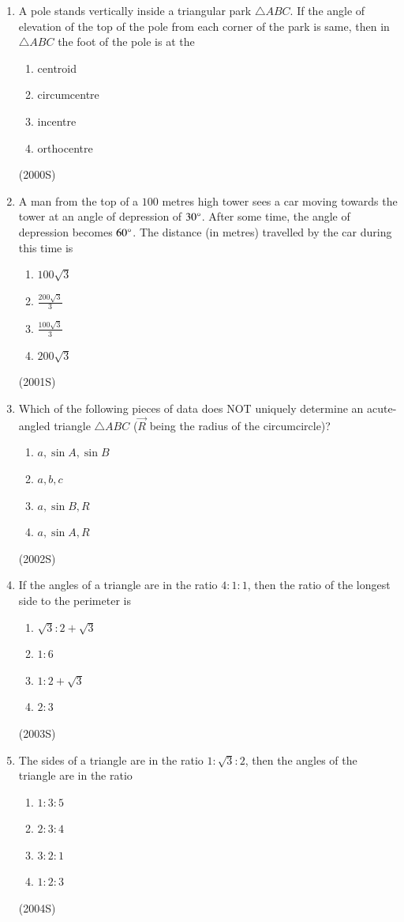 \documentclass[journal]{IEEEtran}
\begin{document}
\begin{enumerate}
\item A pole stands vertically inside a triangular park $\triangle ABC$. If the angle of elevation of the top of the pole from each corner of the park is same, then in $\triangle ABC$ the foot of the pole is at the
\begin{enumerate}
\item centroid
\item circumcentre
\item incentre
\item orthocentre
\end{enumerate}
\hfill (2000S)

\item A man from the top of a $100$ metres high tower sees a car moving towards the tower at an angle of depression of $30\degree$. After some time, the angle of depression becomes $60\degree$. The distance (in metres) travelled by the car during this time is
\begin{enumerate}
\item $100\sqrt{3}$
\item $\frac{200\sqrt{3}}{3}$
\item $\frac{100\sqrt{3}}{3}$
\item $200\sqrt{3}$
\end{enumerate}
\hfill (2001S)

\item Which of the following pieces of data does NOT uniquely determine an acute-angled triangle $\triangle ABC$ ($\vec{R}$ being the radius of the circumcircle)?
\begin{enumerate}
\item $a, \sin A, \sin B$
\item $a, b, c$
\item $a, \sin B, R$
\item $a, \sin A, R$
\end{enumerate}
\hfill (2002S)

\item If the angles of a triangle are in the ratio $4\colon1\colon1$, then the ratio of the longest side to the perimeter is
\begin{enumerate}
\item $\sqrt{3}\colon2+\sqrt{3}$
\item $1\colon6$
\item $1\colon2+\sqrt{3}$
\item $2\colon3$
\end{enumerate}
\hfill (2003S)

\item The sides of a triangle are in the ratio $1\colon\sqrt{3}\colon2$, then the angles of the triangle are in the ratio
\begin{enumerate}
\item $1\colon3\colon5$
\item $2\colon3\colon4$
\item $3\colon2\colon1$
\item $1\colon2\colon3$
\end{enumerate}
\hfill (2004S)


\end{enumerate}
\end{document}
